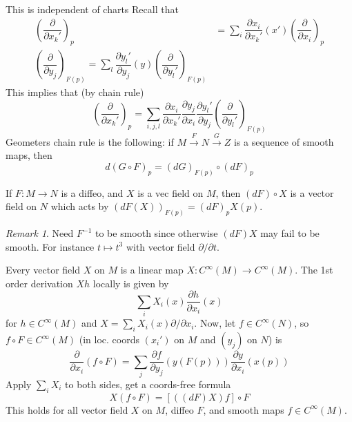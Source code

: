 \documentclass{article}
\theoremstyle{definition}
\theoremstyle{remark}
\newtheorem{rem}{Remark}
\theoremstyle{plain}
\begin{document}
This is independent of charts
Recall that
\begin{align*}
    \left(\dfrac{\partial }{\partial x_k'}\right)_p&=\sum_i\dfrac{\partial x_i}{\partial x_k'}(x')\left(\dfrac{\partial }{\partial x_i}\right)_p\\
    \left(\dfrac{\partial }{\partial y_j}\right)_{F(p)}=\sum_l\dfrac{\partial y_l'}{\partial y_j}(y)\left(\dfrac{\partial}{\partial y_l'}\right)_{F(p)}
\end{align*}
This implies that (by chain rule)
\[\left(\dfrac{\partial }{\partial x_k'}\right)_p=\sum_{i,j,l}\dfrac{\partial x_i}{\partial x_k'}\dfrac{\partial y_j}{\partial x_i}\dfrac{\partial y_l'}{\partial y_j}\left(\dfrac{\partial}{\partial y_l'}\right)_{F(p)}\]
Geometers chain rule is the following: if $M\overset{F}{\to}N\overset{G}{\to}Z$ is a sequence of smooth maps, then
\[d(G\circ F)_p=(d G)_{F(p)}\circ(dF)_p\]

If $F:M\to N$ is a diffeo, and $X$ is a vec field on $M$, then $(dF)\circ X$ is a vector field on $N$ which acts by $(dF(X))_{F(p)}=(dF)_pX(p)$.
\begin{rem}
    Need $F^{-1}$ to be smooth since otherwise $(dF)X$ may fail to be smooth. For instance $t\mapsto t^3$ with vector field $\partial/\partial t$.
\end{rem}
Every vector field $X$ on $M$ is a linear map $X:C^\infty(M)\to C^\infty(M)$. The 1st order derivation $Xh$ locally is given by 
\[\sum_i X_i(x)\dfrac{\partial h}{\partial x_i}(x)\]
for $h\in C^\infty(M)$ and $X=\sum_iX_i(x)\partial/\partial x_i$.
Now, let $f\in C^\infty(N)$, so $f\circ F\in C^\infty(M)$ (in loc. coords $(x_i')$ on $M$ and $(y_j)$ on $N$) is 
\[\dfrac{\partial}{\partial x_i}(f\circ F)=\sum_j\dfrac{\partial f}{\partial y_j}(y(F(p)))\dfrac{\partial y}{\partial x_i}(x(p))\]
Apply $\sum_iX_i$ to both sides, get a coords-free formula
\[X(f\circ F)=[((dF)X)f]\circ F\]
This holds for all vector field $X$ on $M$, diffeo $F$, and smooth maps $f\in C^\infty(M)$.
\end{document}
